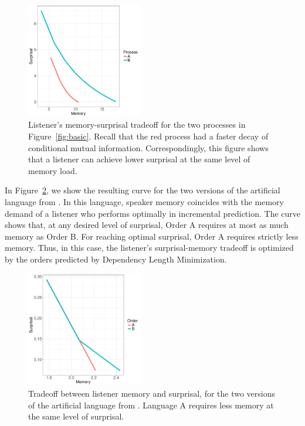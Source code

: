 \documentclass[11pt,letterpaper]{article}
\begin{document}
\begin{figure}
\includegraphics[width=0.45\textwidth]{toy/listener-tradeoff.pdf}
	\caption{Listener's memory-surprisal tradeoff for the two processes in Figure~\ref{fig:basic}. Recall that the red process had a faster decay of conditional mutual information. Correspondingly, this figure shows that a listener can achieve lower surprisal at the same level of memory load.}\label{fig:listener-tradeoff}
\end{figure}


In Figure~\ref{fig:toy-listener-tradeoff}, we show the resulting curve for the two versions of the artificial language from \cite{fedzechkina-human-2017}.
In this language, speaker memory coincides with the memory demand of a listener who performs optimally in incremental prediction.
The curve shows that, at any desired level of surprisal, Order A requires at most as much memory as Order B.
For reaching optimal surprisal, Order A requires strictly less memory.
Thus, in this case, the listener's surprisal-memory tradeoff is optimized by the orders predicted by Dependency Length Minimization.

\begin{figure}
\includegraphics[width=0.45\textwidth]{toy/toy-mem-surp.pdf}
	\caption{Tradeoff between listener memory and surprisal, for the two versions of the artificial language from \cite{fedzechkina-human-2017}. Language A requires less memory at the same level of surprisal.}\label{fig:toy-listener-tradeoff}
\end{figure}
\end{document}
